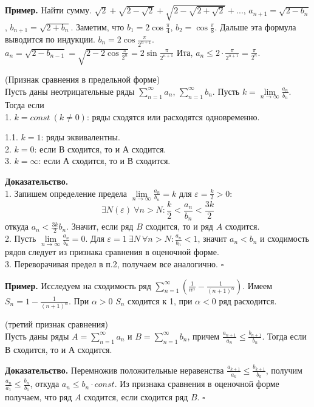 \textbf{Пример.} Найти сумму. $\sqrt{2}+\sqrt{2-\sqrt{2} }+\sqrt{2-
\sqrt{2+\sqrt{2} } } +...$, $a_{n+1}=\sqrt{2-b_n} $, $b_{n+1}=\sqrt{2+b_n} $.
Заметим, что $b_1=2\cos\frac{\pi}{4}$, $b_2=\cos\frac{\pi}{8}$. Дальше
эта формула выводится по индукции. $b_n=2\cos\frac{\pi}{2^{n+1}}$. 
$a_n=\sqrt{2-b_{n-1}}=\sqrt{2-2\cos\frac{\pi}{2^n}}=2\sin\frac{\pi}{2^{n+1}}$ 
Ита, $a_n\leqslant 2\cdot \frac{\pi}{2^{n+1}}=\frac{\pi}{2^n}$.

\begin{theor}
    (Признак сравнения в предельной форме)\\
    Пусть даны неотрицательные ряды $\sum\limits_{n=1}^{\infty} a_n$, 
    $\sum\limits_{n=1}^{\infty}b_n$. Пусть $k=\lim\limits_{n \to \infty}
    \frac{a_n}{b_n}$. Тогда если\\
1. $k=const~(k\ne 0)$: ряды сходятся или расходятся одновременно.

1.1. $k=1$: ряды эквивалентны.\\
2. $k=0$: если В сходится, то и А сходится.\\
3. $k=\infty$: если А сходится, то и В сходится.
\end{theor}
\textbf{Доказательство.}\\
1. Запишем определение предела $\lim\limits_{n \to \infty} \frac{a_n}{b_n}=k$
для $\varepsilon=\frac{k}{2}>0$:
$$\exists N(\varepsilon)~\forall n>N:\frac{k}{2}<\frac{a_n}{b_n}<\frac{3k}{2}$$откуда $a_n<\frac{3k}{2}b_n$.
Значит, если ряд $B$ сходится, то и ряд $A$ сходится.\\
2. Пусть $\lim\limits_{n \to \infty}\frac{a_n}{b_n}=0$. Для $\varepsilon=1~
\exists N~\forall n>N: \frac{a_n}{b_n}<1$, 
значит $a_n<b_n$ и сходимость рядов следует из признака сравнения в оценочной 
форме.\\
3. Переворачивая предел в п.2, получаем все аналогично. $\square$ 

\textbf{Пример.} Исследуем на сходимость ряд
$\sum\limits_{n=1}^{\infty}(\frac{1}{n^\alpha}-
\frac{1}{(n+1)^\alpha})$. Имеем $S_n=1-\frac{1}{(n+1)^\alpha}$.
При $\alpha>0$ $S_n$ сходится к 1, при $\alpha<0$ ряд расходится.

\begin{theor} (третий признак сравнения)\\
Пусть даны ряды $A=\sum\limits_{n=1}^{\infty} a_n$ и 
$B=\sum\limits_{n=1}^{\infty} b_n$, причем 
$\frac{a_{n+1}}{a_n}\leqslant \frac{b_{n+1}}{b_n}$. Тогда если
В сходится, то и А сходится.
\end{theor}
\textbf{Доказательство.} 
Перемножив положительные неравенства $\frac{a_{k+1}}{a_k}\leqslant 
\frac{b_{k+1}}{b_k}$, получим $\frac{a_n}{a_1}\leqslant \frac{b_n}{b_1}$, 
откуда $a_n\leqslant b_n\cdot const$. Из признака сравнения в оценочной форме
получаем, что ряд $A$ сходится, если сходится ряд  $B$. $\square$ 

